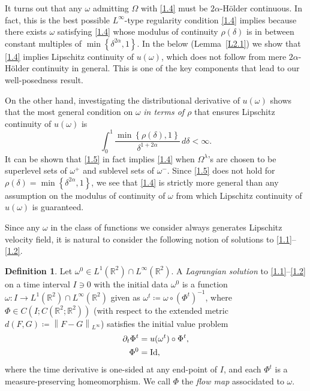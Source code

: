 \documentclass[reqno,centertags,12pt]{amsart}
\theoremstyle{definition}
\newtheorem{definition}[theorem]{Definition}
\numberwithin{equation}{section}
\newcommand{\norm}[1]{\left\|#1\right\|}
\newcommand{\set}[1]{\left\{ #1 \right\}}
\newcommand{\bbR}{{\mathbb{R}}}
\begin{document}
It turns out that any $\omega$ admitting $\Omega$ with \eqref{1.4} must be
$2\alpha$-H\"{o}lder continuous. In fact, this is the best possible
$L^{\infty}$-type regularity condition \eqref{1.4} implies because
there exists $\omega$ satisfying \eqref{1.4} whose modulus of continuity $\rho(\delta)$
is in between constant multiples of $\min\left\{\delta^{2\alpha},1\right\}$.
In the below (Lemma~\ref{L2.1}) we show that \eqref{1.4} implies
Lipschitz continuity of $u(\omega)$, which does not follow from mere
$2\alpha$-H\"{o}lder continuity in general. This is one of the key components that lead to
our well-posedness result.

On the other hand, investigating the distributional derivative of
$u(\omega)$ shows that the most general condition on $\omega$
\emph{in terms of $\rho$} that ensures Lipschitz continuity of $u(\omega)$ is
\begin{equation}\label{1.5}
    \int_{0}^{1}\frac{\min\set{\rho(\delta),1}}{\delta^{1+2\alpha}}\,d\delta < \infty.
\end{equation}
It can be shown that \eqref{1.5} in fact implies \eqref{1.4} when
$\Omega^{\lambda}$'s are chosen to be superlevel sets of $\omega^{+}$ and
sublevel sets of $\omega^{-}$. Since \eqref{1.5} does not hold for
$\rho(\delta) = \min\set{\delta^{2\alpha},1}$, we see that \eqref{1.4}
is strictly more general than any assumption on the modulus of continuity of $\omega$
from which Lipschitz continuity of $u(\omega)$ is guaranteed.

Since any $\omega$ in the class of functions we consider always generates
Lipschitz velocity field, it is natural to consider
the following notion of solutions to \eqref{1.1}--\eqref{1.2}.

\begin{definition}
    Let $\omega^{0}\in L^{1}(\bbR^{2})\cap L^{\infty}(\bbR^{2})$.
    A \emph{Lagrangian solution}
    to \eqref{1.1}--\eqref{1.2} on a time interval $I\owns 0$ with
    the initial data $\omega^{0}$ is a function
    $\omega\colon I\to L^{1}(\bbR^{2})\cap L^{\infty}(\bbR^{2})$ given as
    $\omega^{t}\coloneqq \omega\circ(\Phi^{t})^{-1}$, where
    $\Phi\in C\left(I;C(\bbR^{2};\bbR^{2})\right)$
    (with respect to the extended metric $d(F,G) \coloneqq \norm{F - G}_{L^{\infty}}$)
    satisfies the initial value problem
    \begin{equation}\label{1.6}
        \begin{aligned}
           \partial_{t}\Phi^{t} &= u(\omega^{t}) \circ \Phi^{t}, \\
            \Phi^{0} &= {\rm Id},
        \end{aligned}
    \end{equation}
    where the time derivative is one-sided at any end-point of $I$,
    and each $\Phi^{t}$ is a measure-preserving homeomorphism.
    We call $\Phi$ the \emph{flow map} associdated to $\omega$.
\end{definition}
\end{document}
